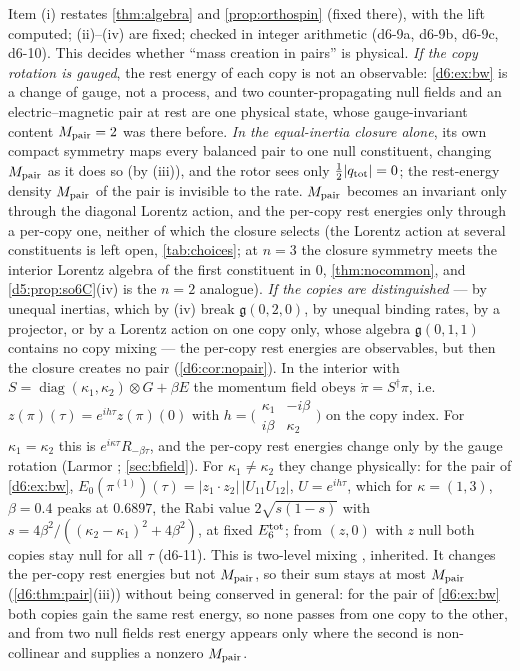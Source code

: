 Item (i) restates \cref{thm:algebra} and \cref{prop:orthospin} (fixed there), with the lift computed; (ii)--(iv) are fixed; checked in integer
arithmetic (d6-9a, d6-9b, d6-9c, d6-10). This decides whether ``mass creation in pairs'' is physical. \emph{If the copy rotation is gauged}, the rest energy of
each copy is not an observable: \cref{d6:ex:bw} is a change of gauge, not a process, and two counter-propagating null fields and an
electric--magnetic pair at rest are one physical state, whose gauge-invariant content $M_{\rm pair}=2$ was there before. \emph{In the
equal-inertia closure alone}, its own compact symmetry maps every balanced pair to one null constituent, changing $M_{\rm pair}$ as it does so (by (iii)), and the rotor sees only
$\tfrac12|q_{\rm tot}|=0$; the rest-energy density $M_{\rm pair}$ of the pair is invisible to the rate. $M_{\rm pair}$ becomes an invariant only through the diagonal Lorentz action, and the per-copy rest energies only through a per-copy one,
neither of which the closure selects (the Lorentz action at several constituents is left open, \cref{tab:choices}; at $n=3$ the closure symmetry meets the interior Lorentz algebra of the first constituent in $0$, \cref{thm:nocommon}, and \cref{d5:prop:so6C}(iv) is the $n=2$ analogue). \emph{If the copies are
distinguished} --- by unequal inertias, which by (iv) break $\mathfrak g(0,2,0)$, by unequal binding rates, by a projector, or by a Lorentz
action on one copy only, whose algebra $\mathfrak g(0,1,1)$ contains no copy mixing --- the per-copy rest energies are observables, but then the
closure creates no pair (\cref{d6:cor:nopair}). In the interior with $S=\operatorname{diag}(\kappa_1,\kappa_2)\otimes G+\beta E$ the momentum field
obeys $\dot\pi=S^\dagger\pi$, i.e.\ $z(\pi)(\tau)=e^{ih\tau}z(\pi)(0)$ with $h=\bigl(\begin{smallmatrix}\kappa_1&-i\beta\\i\beta&\kappa_2\end{smallmatrix}\bigr)$ on the
copy index. For $\kappa_1=\kappa_2$ this is $e^{i\kappa\tau}R_{-\beta\tau}$, and the per-copy rest energies change only by the gauge rotation
(Larmor \cite{Larmor1897}; \cref{sec:bfield}). For $\kappa_1\neq\kappa_2$ they change physically: for the pair of \cref{d6:ex:bw},
$E_0(\pi^{(1)})(\tau)=|z_1\cdot z_2|\,|U_{11}U_{12}|$, $U=e^{ih\tau}$, which for $\kappa=(1,3)$, $\beta=0.4$ peaks at $0.6897$, the Rabi value
$2\sqrt{s(1-s)}$ with $s=4\beta^2/((\kappa_2-\kappa_1)^2+4\beta^2)$, at fixed $E_6^{\rm tot}$; from $(z,0)$ with $z$ null both copies stay null for all
$\tau$ (d6-11). This is two-level mixing \cite{Rabi37}, inherited. It changes the per-copy rest energies but not $M_{\rm pair}$, so their sum stays at most
$M_{\rm pair}$ (\cref{d6:thm:pair}(iii)) without being conserved in general: for the pair of \cref{d6:ex:bw} both copies gain the same rest
energy, so none passes from one copy to the other, and from two null fields rest energy appears only where the second is non-collinear and
supplies a nonzero $M_{\rm pair}$.

